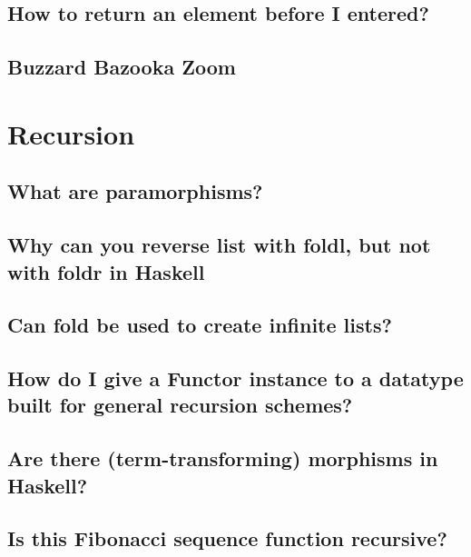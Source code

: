 \documentclass{book}
\begin{document}
\section{How to return an element before I entered?}


\section{Buzzard Bazooka Zoom}




\chapter{Recursion}

\section{What are paramorphisms?}


\section{Why can you reverse list with foldl, but not with foldr in Haskell}


\section{Can fold be used to create infinite lists?}


\section{How do I give a Functor instance to a datatype built for general recursion schemes?}


\section{Are there (term-transforming) morphisms in Haskell?}


\section{Is this Fibonacci sequence function recursive?}

\end{document}
